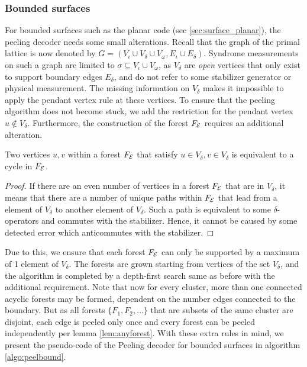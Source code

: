 \subsubsection{Bounded surfaces}
For bounded surfaces such as the planar code (sec \ref{sec:surface_planar}), the peeling decoder needs some small alterations. Recall that the graph of the primal lattice is now denoted by $G = (V_\iota\cup V_{\delta} \cup V_{\omega}, E_\iota \cup E_{\delta})$. Syndrome measurements on such a graph are limited to $\sigma \subseteq V_\iota\cup V_\omega$, as $V_\delta$ are \emph{open} vertices that only exist to support boundary edges $E_\delta$, and do not refer to some stabilizer generator or physical measurement. The missing information on $V_\delta$ makes it impossible to apply the pendant vertex rule at these vertices. To ensure that the peeling algorithm does not become stuck, we add the restriction for the pendant vertex $u \notin V_\delta$. Furthermore, the construction of the forest $F_{\mathcal{E}}$ requires an additional alteration.
\begin{lemma}
  Two vertices $u,v$ within a forest $F_{\mathcal{E}}$ that satisfy $u\in V_\delta, v \in V_\delta$ is equivalent to a cycle in $F_{\mathcal{E}}$.
\end{lemma}
\begin{proof}
  If there are an even number of vertices in a forest $F_{\mathcal{E}}$ that are in $V_\delta$, it means that there are a number of unique paths within $F_{\mathcal{E}}$ that lead from a element of $V_\delta$ to another element of $V_\delta$. Such a path is equivalent to some $\delta$-operators and commutes with the stabilizer. Hence, it cannot be caused by some detected error which anticommutes with the stabilizer.
\end{proof}

Due to this, we ensure that each forest $F_{\mathcal{E}}$ can only be supported by a maximum of 1 element of $V_\delta$. The forests are grown starting from vertices of the set $V_\delta$, and the algorithm is completed by a depth-first search same as before with the additional requirement. Note that now for every cluster, more than one connected acyclic forests may be formed, dependent on the number edges connected to the boundary. But as all forests $\{F_1, F_2,...\}$ that are subsets of the same cluster are disjoint, each edge is peeled only once and every forest can be peeled independently per lemma \ref{lem:anyforest}. With these extra rules in mind, we present the pseudo-code of the Peeling decoder for bounded surfaces in algorithm \ref{algo:peelbound}.

